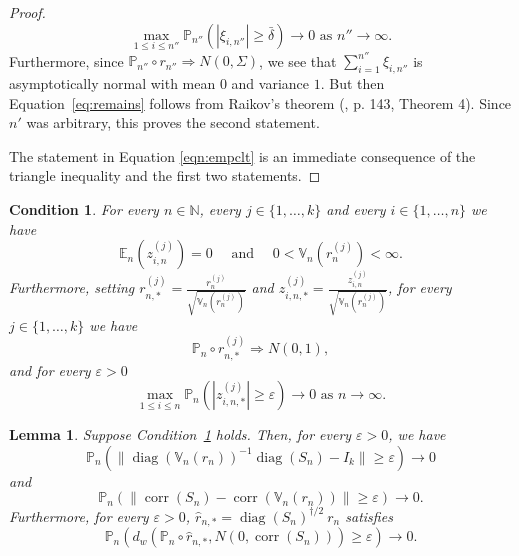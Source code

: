 \documentclass[preprint]{imsart}
\newcommand{\N}{{\mathbb N}}
\newcommand{\eps}{\varepsilon}
\DeclareMathOperator{\diag}{diag}
\DeclareMathOperator{\corr}{corr}
\newtheorem{lemma}[theorem]{Lemma}
\newtheorem{condition}{Condition}
\numberwithin{equation}{section}
\begin{document}
\begin{proof}
%
\begin{equation}
\max_{1 \leq i \leq n''} \mathbb{P}_{n''} \left(|\xi_{i, n''}| \geq \bar{\delta} \right) \to 0 \text{ as } n'' \rightarrow \infty.
\end{equation}
%
Furthermore, since $\mathbb{P}_{n''} \circ r_{n''} \Rightarrow N(0, \Sigma)$, we see that $\sum_{i = 1}^{n''} \xi_{i,n''}$ is asymptotically normal with mean $0$ and variance $1$. But then Equation~\eqref{eq:remains} follows from Raikov's theorem (\cite{gnedenko}, p. 143, Theorem 4). Since $n'$ was arbitrary, this proves the second statement. 

The statement in Equation \eqref{eqn:empclt} is an immediate consequence of the triangle inequality and the first two statements.
\end{proof}

\begin{condition}\label{cond:zmomstd}
For every $n \in \N$, every $j \in \{1, \hdots, k\}$ and every $i \in \{1, \hdots, n\}$ we have
\begin{equation}\label{EQ:momsts}
\mathbb{E}_n(z^{(j)}_{i,n}) = 0 \quad \text{ and } \quad 0 < \mathbb{V}_n(r^{(j)}_n) < \infty.
\end{equation}
Furthermore, setting $r^{(j)}_{n,*} = \frac{r^{(j)}_{n}}{\sqrt{\mathbb{V}_n(r^{(j)}_n)}}$ and $z^{(j)}_{i, n, *} = \frac{z^{(j)}_{i, n}}{\sqrt{\mathbb{V}_n(r^{(j)}_n)}}$, for every $j \in \{1, \hdots, k\}$ we have
%
\begin{equation}\label{EQ:convstd}
\mathbb{P}_n \circ r^{(j)}_{n,*} \Rightarrow N(0,1),
\end{equation}
%
and for every $\varepsilon > 0$
%
\begin{equation}\label{EQ:negstd}
\max_{1 \leq i \leq n} \mathbb{P}_n\left(|z^{(j)}_{i,n, *}|\geq \varepsilon \right) \to 0 \text{ as } n \to \infty.
\end{equation}
%
\end{condition}


\begin{lemma}\label{lemma:nonstd}
Suppose Condition~\ref{cond:zmomstd} holds. Then, for every $\varepsilon > 0$, we have
%
\begin{equation}\label{EQ:diags}
\mathbb{P}_n \left( \|\diag(\mathbb{V}_n(r_n))^{-1} \diag(S_n)  - I_k\| \geq \varepsilon \right) \to 0
\end{equation}
%
and
%
\begin{equation}\label{EQ:corrs}
\mathbb{P}_n \left( \|\corr \left( S_n \right) - \corr \left(  \mathbb{V}_n(r_n) \right)\| \geq \varepsilon \right) \to 0.
\end{equation}
%
Furthermore, for every $\eps > 0$, $\hat{r}_{n,*} = \diag(S_n)^{\dagger/2} ~  r_n$ satisfies 
%
\begin{equation}
\mathbb{P}_n \left(d_w\left(\mathbb{P}_n \circ  \hat{r}_{n,*}  , N(0, \corr(S_n))\right) \geq \eps \right) \rightarrow 0.
\end{equation}
%

\end{lemma}
\end{document}
